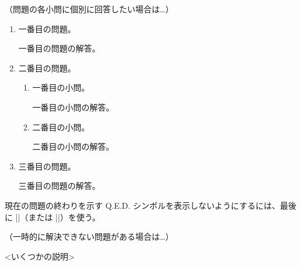 \documentclass[11pt,
  logo = {example-image},
  title in boldface,
  theorem in new line,
]{homework}
\begin{document}
\bigskip\textcolor{gray!55}{（問題の各小問に個別に回答したい場合は…）}

\begin{problem}[多くの小問がある問題]
    \begin{enumerate}[itemsep=.5\baselineskip]
        \item 一番目の問題。

        \begin{solution}
            一番目の問題の解答。
        \end{solution}

        \item 二番目の問題。

        \begin{enumerate}[itemsep=.3\baselineskip]
            \item 一番目の小問。

            \begin{solution}
                一番目の小問の解答。
            \end{solution}

            \item 二番目の小問。

            \begin{solution}
                二番目の小問の解答。
            \end{solution}

        \end{enumerate}

        \item 三番目の問題。

        \begin{solution}
            三番目の問題の解答。
        \end{solution}

    \end{enumerate}
    現在の問題の終わりを示す Q.E.D. シンボルを表示しないようにするには、最後に \cverb|\noqed|（または \cverb|\noQED|）を使う。
    \noQED
\end{problem}


\bigskip\textcolor{gray!55}{（一時的に解決できない問題がある場合は…）}

\DNF<いくつかの説明>
\end{document}
